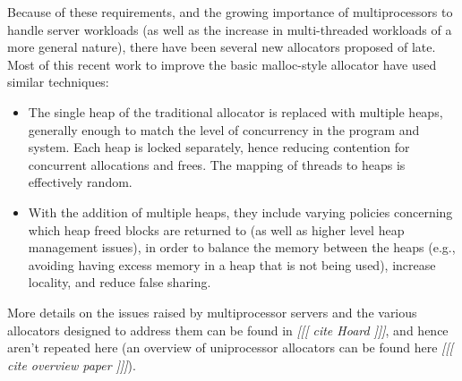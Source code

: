 \documentclass[dvips,11pt]{article}
\newcommand\fixnote[1]{\emph{[[[ #1 ]]]}}
\begin{document}
Because of these requirements, and the growing importance of
multiprocessors to handle server workloads (as well as the increase in
multi-threaded workloads of a more general nature), there have been several
new allocators proposed of late.  Most of this recent work to improve
the basic malloc-style allocator have used similar techniques:
\begin{itemize}
\item The single heap of the traditional allocator is replaced with
  multiple heaps, generally enough to match the level of concurrency in the 
  program and system.  Each heap is locked separately, hence reducing
  contention for concurrent allocations and frees.  The mapping of
  threads to heaps is effectively random.
\item With the addition of multiple heaps, they include varying policies
  concerning which heap freed blocks are returned to (as well as higher
  level heap management issues), in order to balance the memory between the
  heaps (e.g., avoiding having excess memory in a heap that is not being
  used), increase locality, and reduce false sharing.
\end{itemize}
More details on the issues raised by multiprocessor servers and the various
allocators designed to address them can be found in \fixnote{cite Hoard},
and hence aren't repeated here (an overview of uniprocessor allocators can
be found here \fixnote{cite overview paper}).  
\end{document}
